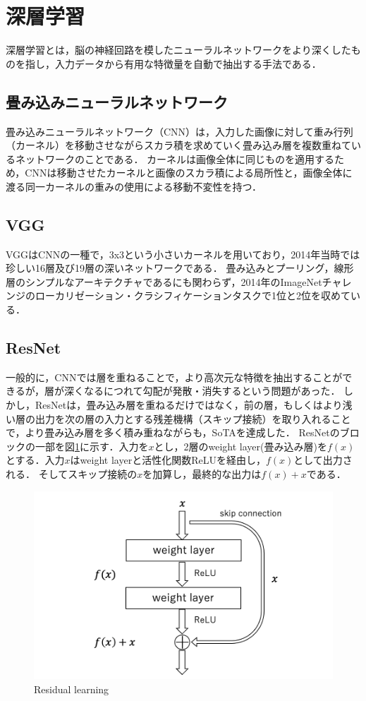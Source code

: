 \documentclass[a4paper, oneside, openany, dvipdfmx]{suribt}%
\newcommand{\fref}[1]{図\ref{#1}}
\begin{document}
\section{深層学習}
深層学習とは，脳の神経回路を模したニューラルネットワークをより深くしたものを指し，入力データから有用な特徴量を自動で抽出する手法である．
\subsection{畳み込みニューラルネットワーク}
畳み込みニューラルネットワーク（CNN）は，入力した画像に対して重み行列（カーネル）を移動させながらスカラ積を求めていく畳み込み層を複数重ねているネットワークのことである．
カーネルは画像全体に同じものを適用するため，CNNは移動させたカーネルと画像のスカラ積による局所性と，画像全体に渡る同一カーネルの重みの使用による移動不変性を持つ．
\subsection{VGG}
VGGはCNNの一種で，3x3という小さいカーネルを用いており，2014年当時では珍しい16層及び19層の深いネットワークである\cite{simonyan2015deep}．
畳み込みとプーリング，線形層のシンプルなアーキテクチャであるにも関わらず，2014年のImageNetチャレンジのローカリゼーション・クラシフィケーションタスクで1位と2位を収めている．

\subsection{ResNet}
一般的に，CNNでは層を重ねることで，より高次元な特徴を抽出することができるが，層が深くなるにつれて勾配が発散・消失するという問題があった．
しかし，ResNetは，畳み込み層を重ねるだけではなく，前の層，もしくはより浅い層の出力を次の層の入力とする残差機構（スキップ接続）を取り入れることで，より畳み込み層を多く積み重ねながらも，SoTAを達成した\cite{he2015deep}．
ResNetのブロックの一部を\fref{fig:res_arch}に示す．入力を$x$とし，2層のweight layer(畳み込み層)を$f(x)$とする．入力$x$はweight layerと活性化関数ReLUを経由し，$f(x)$として出力される．
そしてスキップ接続の$x$を加算し，最終的な出力は$f(x)+x$である．
\begin{figure}[H]
  \centering
  \includegraphics[width=0.9\linewidth]{figs/resnet.png}
  \caption{Residual learning\cite{he2015deep}}
  \label{fig:res_arch}
\end{figure}
\end{document}
